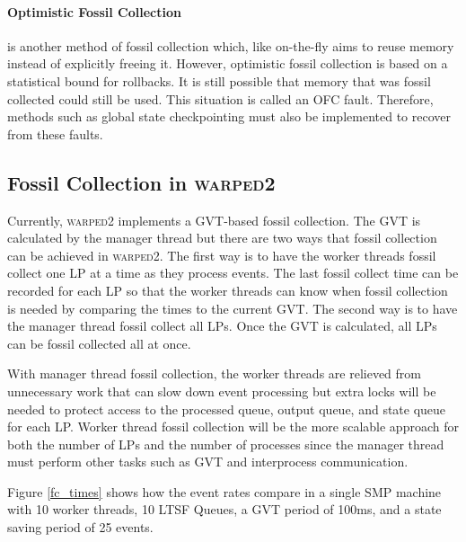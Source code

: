 \documentclass[11pt]{book}
\begin{document}
\paragraph{Optimistic Fossil Collection} \cite{young-98-disc} is another method of fossil collection
which, like on-the-fly aims to reuse memory instead of explicitly freeing it.  However, optimistic
fossil collection is based on a statistical bound for rollbacks.  It is still possible that memory
that was fossil collected could still be used.  This situation is called an OFC fault.  Therefore,
methods such as global state checkpointing must also be implemented to recover from these faults.

\subsection{Fossil Collection in \textsc{warped2}}

Currently, \textsc{warped2} implements a GVT-based fossil collection.  The GVT is calculated by
the manager thread but there are two ways that fossil collection can be achieved in \textsc{warped2}.
The first way is to have the worker threads fossil collect one LP at a time as they process events.
The last fossil collect time can be recorded for each LP so that the worker threads can know when fossil
collection is needed by comparing the times to the current GVT.  The second way is to have the
manager thread fossil collect all LPs.  Once the GVT is calculated, all LPs can be fossil collected
all at once.

With manager thread fossil collection, the worker threads are relieved from unnecessary work
that can slow down event processing but extra locks will be needed to protect access to the
processed queue, output queue, and state queue for each LP.  Worker thread fossil collection
will be the more scalable approach for both the number of LPs and the number of processes since
the manager thread must perform other tasks such as GVT and interprocess communication.

Figure \ref{fc_times} shows how the event rates compare in a single SMP machine with 10 worker
threads, 10 LTSF Queues, a GVT period of 100ms, and a state saving period of 25 events.
\end{document}
